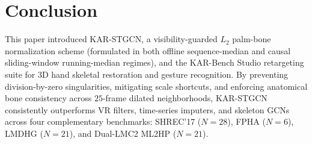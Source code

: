 \documentclass[10pt,twocolumn]{article}
\begin{document}
\section{Conclusion}
This paper introduced KAR-STGCN, a visibility-guarded $L_2$ palm-bone normalization scheme (formulated in both offline sequence-median and causal sliding-window running-median regimes), and the KAR-Bench Studio retargeting suite for 3D hand skeletal restoration and gesture recognition. By preventing division-by-zero singularities, mitigating scale shortcuts, and enforcing anatomical bone consistency across $25$-frame dilated neighborhoods, KAR-STGCN consistently outperforms VR filters, time-series imputers, and skeleton GCNs across four complementary benchmarks: SHREC'17 ($N=28$), FPHA ($N=6$), LMDHG ($N=21$), and Dual-LMC2 ML2HP ($N=21$).
\end{document}
